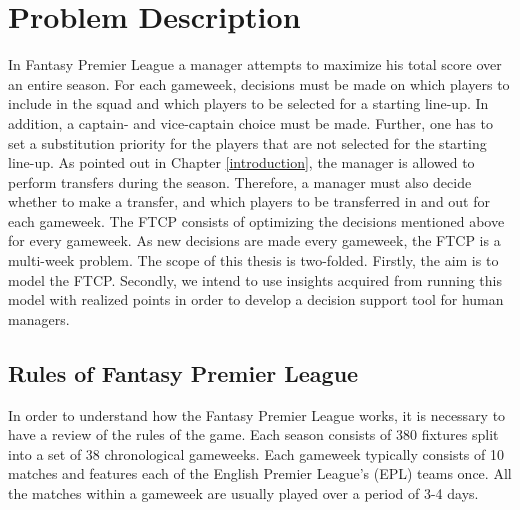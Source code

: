 
\chapter{Problem Description}
In Fantasy Premier League a manager attempts to maximize his total score over an entire season. For each gameweek, decisions must be made on which players to include in the squad and which players to be selected for a starting line-up. In addition, a captain- and vice-captain choice must be made. Further, one has to set a substitution priority for the players that are not selected for the starting line-up. As pointed out in Chapter \ref{introduction}, the manager is allowed to perform transfers during the season. Therefore, a manager must also decide whether to make a transfer, and which players to be transferred in and out for each gameweek.
\newpar
The FTCP consists of optimizing the decisions mentioned above for every gameweek. As new decisions are made every gameweek, the FTCP is a multi-week problem. The scope of this thesis is two-folded. Firstly, the aim is to model the FTCP. Secondly, we intend to use insights acquired from running this model with realized points in order to develop a decision support tool for human managers. 

\section{Rules of Fantasy Premier League} \label{rules of fpl}

In order to understand how the Fantasy Premier League works, it is necessary to have a review of the rules of the game. Each season consists of 380 fixtures split into a set of 38 chronological gameweeks. Each gameweek typically consists of 10 matches and features each of the English Premier League's (EPL) teams once. All the matches within a gameweek are usually played over a period of 3-4 days.

\newpar


